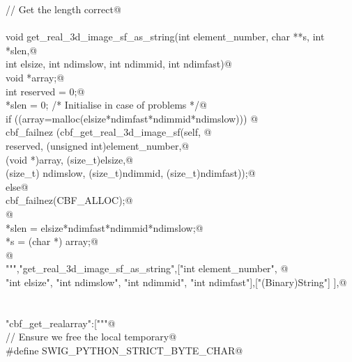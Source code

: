 \documentclass[10pt,a4paper,twoside,notitlepage]{article}
\begin{document}
\begin{flushleft}
\begin{minipage}{\linewidth}
\begin{list}{}{}
\mbox{}\verb@// Get the length correct@\\
\mbox{}\verb@@\\
\mbox{}\verb@    void get_real_3d_image_sf_as_string(int element_number, char **s, int *slen,@\\
\mbox{}\verb@    int elsize, int ndimslow, int ndimmid, int ndimfast){@\\
\mbox{}\verb@        void *array;@\\
\mbox{}\verb@        int reserved = 0;@\\
\mbox{}\verb@        *slen = 0; /* Initialise in case of problems */@\\
\mbox{}\verb@        if ((array=malloc(elsize*ndimfast*ndimmid*ndimslow))) {@\\
\mbox{}\verb@               cbf_failnez (cbf_get_real_3d_image_sf(self, @\\
\mbox{}\verb@               reserved, (unsigned int)element_number,@\\
\mbox{}\verb@               (void *)array, (size_t)elsize,@\\
\mbox{}\verb@               (size_t) ndimslow, (size_t)ndimmid, (size_t)ndimfast));@\\
\mbox{}\verb@         }else{@\\
\mbox{}\verb@               cbf_failnez(CBF_ALLOC);@\\
\mbox{}\verb@         }@\\
\mbox{}\verb@        *slen = elsize*ndimfast*ndimmid*ndimslow;@\\
\mbox{}\verb@        *s = (char *) array;@\\
\mbox{}\verb@      }@\\
\mbox{}\verb@""","get_real_3d_image_sf_as_string",["int element_number", @\\
\mbox{}\verb@    "int elsize", "int ndimslow", "int ndimmid", "int ndimfast"],["(Binary)String"] ],@\\
\mbox{}\verb@@\\
\mbox{}\verb@@\\
\mbox{}\verb@"cbf_get_realarray":["""@\\
\mbox{}\verb@// Ensure we free the local temporary@\\
\mbox{}\verb@%{@\\
\mbox{}\verb@#define SWIG_PYTHON_STRICT_BYTE_CHAR@\\
\mbox{}\verb@%}@\\
\mbox{}\verb@%cstring_output_allocate_size(char ** s, int *slen, free(*$1))@\\

\end{list}
\end{minipage}
\end{flushleft}
\end{document}

